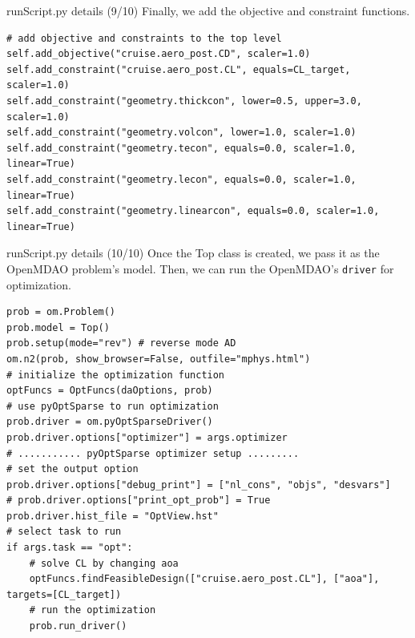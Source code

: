 \documentclass{bredelebeamer}
\begin{document}
\begin{frame}[fragile]{runScript.py details (9/10)}
Finally, we add the objective and constraint functions.
  \footnotesize
  \lstset{ language=bash }
  \begin{lstlisting}
# add objective and constraints to the top level
self.add_objective("cruise.aero_post.CD", scaler=1.0)
self.add_constraint("cruise.aero_post.CL", equals=CL_target, scaler=1.0)
self.add_constraint("geometry.thickcon", lower=0.5, upper=3.0, scaler=1.0)
self.add_constraint("geometry.volcon", lower=1.0, scaler=1.0)
self.add_constraint("geometry.tecon", equals=0.0, scaler=1.0, linear=True)
self.add_constraint("geometry.lecon", equals=0.0, scaler=1.0, linear=True)
self.add_constraint("geometry.linearcon", equals=0.0, scaler=1.0, linear=True)
  \end{lstlisting}
  \normalsize
  \end{frame}

\begin{frame}[fragile]{runScript.py details (10/10)}
Once the Top class is created, we pass it as the OpenMDAO problem's model. Then, we can run the OpenMDAO's \texttt{driver} for optimization.
  \footnotesize
  \lstset{ language=bash }
  \begin{lstlisting}
prob = om.Problem()
prob.model = Top()
prob.setup(mode="rev") # reverse mode AD
om.n2(prob, show_browser=False, outfile="mphys.html")
# initialize the optimization function
optFuncs = OptFuncs(daOptions, prob)
# use pyOptSparse to run optimization
prob.driver = om.pyOptSparseDriver()
prob.driver.options["optimizer"] = args.optimizer
# ........... pyOptSparse optimizer setup .........
# set the output option
prob.driver.options["debug_print"] = ["nl_cons", "objs", "desvars"]
# prob.driver.options["print_opt_prob"] = True
prob.driver.hist_file = "OptView.hst"
# select task to run
if args.task == "opt":
    # solve CL by changing aoa
    optFuncs.findFeasibleDesign(["cruise.aero_post.CL"], ["aoa"], targets=[CL_target])
    # run the optimization
    prob.run_driver()
  \end{lstlisting}
  \normalsize
  \end{frame}
\end{document}

